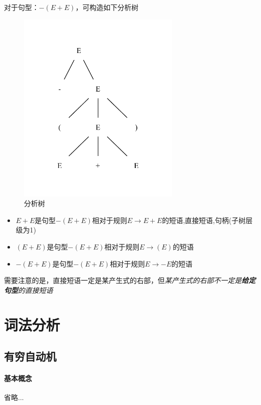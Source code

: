 \documentclass[UTF8]{ctexart} %
\begin{document}
对于句型：$-(E+E)$，可构造如下分析树

\begin{figure}[H]
    \centering
    \includegraphics[width=0.7\textwidth]{assets/tree.pdf}
    \caption{分析树}
\end{figure}

\begin{itemize}
    \item $E+E$是句型$-(E+E)$相对于规则$E\rightarrow E+E$的短语,直接短语,句柄(子树层级为1)
    \item $(E+E)$是句型$-(E+E)$相对于规则$E\rightarrow (E)$的短语
    \item $-(E+E)$是句型$-(E+E)$相对于规则$E\rightarrow -E$的短语
\end{itemize}

需要注意的是，直接短语一定是某产生式的右部，但\emph{某产生式的右部不一定是\textbf{给定句型}的直接短语}

\section{词法分析}

\subsection{有穷自动机}

\paragraph{基本概念} 省略...
\end{document}
